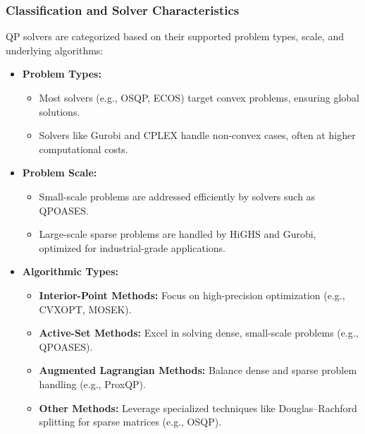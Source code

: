\documentclass{article}
\begin{document}
\subsubsection{Classification and Solver Characteristics}
QP solvers are categorized based on their supported problem types, scale, and underlying algorithms:
\begin{itemize}
    \item \textbf{Problem Types:} 
    \begin{itemize}
        \item Most solvers (e.g., OSQP, ECOS) target convex problems, ensuring global solutions.
        \item Solvers like Gurobi and CPLEX handle non-convex cases, often at higher computational costs.
    \end{itemize}
    \item \textbf{Problem Scale:}
    \begin{itemize}
        \item Small-scale problems are addressed efficiently by solvers such as QPOASES.
        \item Large-scale sparse problems are handled by HiGHS and Gurobi, optimized for industrial-grade applications.
    \end{itemize}
    \item \textbf{Algorithmic Types:}
    \begin{itemize}
        \item \textbf{Interior-Point Methods:} Focus on high-precision optimization (e.g., CVXOPT, MOSEK).
        \item \textbf{Active-Set Methods:} Excel in solving dense, small-scale problems (e.g., QPOASES).
        \item \textbf{Augmented Lagrangian Methods:} Balance dense and sparse problem handling (e.g., ProxQP).
        \item \textbf{Other Methods:} Leverage specialized techniques like Douglas–Rachford splitting for sparse matrices (e.g., OSQP).
    \end{itemize}
\end{itemize}
\end{document}
